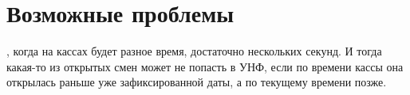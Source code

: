 \section{Возможные проблемы}

\begin{itemize}	
  , когда на кассах будет разное время, достаточно нескольких секунд. И тогда какая-то из открытых смен может не попасть в УНФ, если по времени кассы она открылась раньше уже зафиксированной даты, а по текущему времени позже.

\end{itemize}
